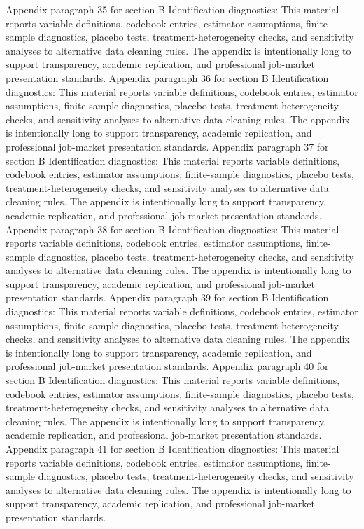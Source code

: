 \documentclass[preprint,12pt]{elsarticle}
\begin{document}
Appendix paragraph 35 for section B Identification diagnostics: This material reports variable definitions, codebook entries, estimator assumptions, finite-sample diagnostics, placebo tests, treatment-heterogeneity checks, and sensitivity analyses to alternative data cleaning rules. The appendix is intentionally long to support transparency, academic replication, and professional job-market presentation standards.
Appendix paragraph 36 for section B Identification diagnostics: This material reports variable definitions, codebook entries, estimator assumptions, finite-sample diagnostics, placebo tests, treatment-heterogeneity checks, and sensitivity analyses to alternative data cleaning rules. The appendix is intentionally long to support transparency, academic replication, and professional job-market presentation standards.
Appendix paragraph 37 for section B Identification diagnostics: This material reports variable definitions, codebook entries, estimator assumptions, finite-sample diagnostics, placebo tests, treatment-heterogeneity checks, and sensitivity analyses to alternative data cleaning rules. The appendix is intentionally long to support transparency, academic replication, and professional job-market presentation standards.
Appendix paragraph 38 for section B Identification diagnostics: This material reports variable definitions, codebook entries, estimator assumptions, finite-sample diagnostics, placebo tests, treatment-heterogeneity checks, and sensitivity analyses to alternative data cleaning rules. The appendix is intentionally long to support transparency, academic replication, and professional job-market presentation standards.
Appendix paragraph 39 for section B Identification diagnostics: This material reports variable definitions, codebook entries, estimator assumptions, finite-sample diagnostics, placebo tests, treatment-heterogeneity checks, and sensitivity analyses to alternative data cleaning rules. The appendix is intentionally long to support transparency, academic replication, and professional job-market presentation standards.
Appendix paragraph 40 for section B Identification diagnostics: This material reports variable definitions, codebook entries, estimator assumptions, finite-sample diagnostics, placebo tests, treatment-heterogeneity checks, and sensitivity analyses to alternative data cleaning rules. The appendix is intentionally long to support transparency, academic replication, and professional job-market presentation standards.
Appendix paragraph 41 for section B Identification diagnostics: This material reports variable definitions, codebook entries, estimator assumptions, finite-sample diagnostics, placebo tests, treatment-heterogeneity checks, and sensitivity analyses to alternative data cleaning rules. The appendix is intentionally long to support transparency, academic replication, and professional job-market presentation standards.
\end{document}
